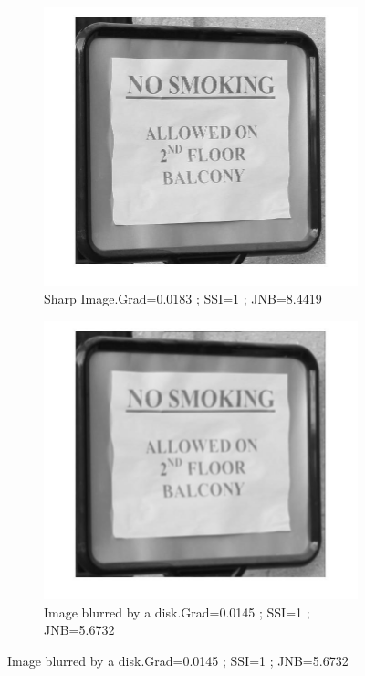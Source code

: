 \begin{figure}[h!]
        \centering
        \begin{subfigure}[b]{0.3\textwidth}
                \centering
                \includegraphics[width=\textwidth]{true.jpg}
                \caption{Sharp Image.\newline Grad=0.0183 ; SSI=1 ; JNB=8.4419}
               
        \end{subfigure}
        \begin{subfigure}[b]{0.3\textwidth}
                 \centering
                 \includegraphics[width=\textwidth]{sign_D.jpg}
                 \caption{Image blurred by a disk.\newline Grad=0.0145 ; SSI=1 ; JNB=5.6732}
                       

\end{subfigure}
\end{figure}
